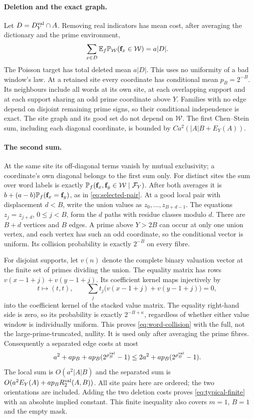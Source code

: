 \paragraph{Deletion and the exact graph.}
Let $D=D_Y^{\rm val}\cap A$. Removing real indicators has mean cost,
after averaging the dictionary and the prime environment,
\[
 \sum_{x\in D}\mathbb E_f\mathbb P_{\mathcal W}(\mathbf f_x\in\mathcal W)=a|D|.
\]
The Poisson target has total deleted mean $a|D|$. This uses no uniformity
of a bad window's law. At a retained site every coordinate has conditional
mean $p_B=2^{-B}$. Its neighbours include all words at its own site,
at each overlapping support and at each support sharing an odd prime
coordinate above $Y$. Families with no edge depend on disjoint remaining
prime signs, so their conditional independence is exact. The site graph
and its good set do not depend on $\mathcal W$.
The first Chen--Stein sum, including each diagonal coordinate, is bounded
by $Ca^2(|A|B+E_Y(A))$.

\paragraph{The second sum.}
At the same site its off-diagonal terms vanish by mutual exclusivity;
a coordinate's own diagonal belongs to the first sum only. For distinct
sites the sum over word labels is exactly
$\mathbb P_f(\mathbf f_x,\mathbf f_y\in\mathcal W\mid\mathcal F_Y)$.
After both averages it is $b+(a-b)\mathbb P_f(\mathbf f_x=\mathbf f_y)$, as in
\eqref{eq:selected-pair}. At a good local pair with displacement $d<B$,
write the union values as $z_0,\ldots,z_{B+d-1}$. The equations
$z_j=z_{j+d}$, $0\le j<B$, form the $d$ paths with residue classes
modulo $d$. There are $B+d$ vertices and $B$ edges. A prime above
$Y>2B$ can occur at only one union vertex, and each vertex has such
an odd coordinate, so the conditional vector is uniform. Its collision
probability is exactly $2^{-B}$ on every fibre.

For disjoint supports, let $v(n)$ denote the complete binary valuation
vector at the finite set of primes dividing the union. The equality
matrix has rows $v(x-1+j)+v(y-1+j)$. Its coefficient kernel maps
injectively by
\[
 t\longmapsto(t,t),\qquad
 \sum_jt_j\bigl(v(x-1+j)+v(y-1+j)\bigr)=0,
\]
into the coefficient kernel of the stacked value matrix. The equality
right-hand side is zero, so its probability is exactly
$2^{-B+\kappa}$, regardless of whether either value window is individually
uniform. This proves \eqref{eq:word-collision} with the full, not the
large-prime-truncated, nullity. It is used only after averaging the prime
fibres. Consequently a separated edge costs at most
\[
 a^2+ap_B+ap_B(2^{\rho_B^{\rm val}}-1)
 \le 2a^2+ap_B(2^{\rho_B^{\rm val}}-1).
\]
The local sum is $O(a^2|A|B)$ and the separated sum is
$O(a^2E_Y(A)+ap_BR_2^{\rm val}(A,B))$. All site pairs here are ordered;
the two orientations are included. Adding the two deletion costs proves
\eqref{eq:typical-finite} with an absolute implied constant. This finite
inequality also covers $m=1$, $B=1$ and the empty mask.


